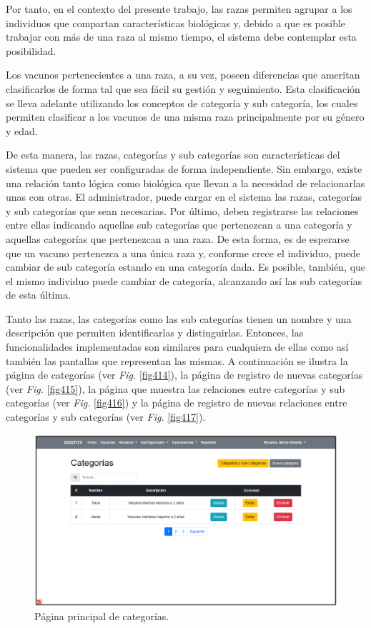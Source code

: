 \documentclass[11pt,oneside]{book}
\begin{document}
Por tanto, en el contexto del presente trabajo, las razas permiten agrupar a los individuos que compartan características biológicas y, debido a que es posible trabajar con más de una raza al mismo tiempo, el sistema debe contemplar esta posibilidad.

Los vacunos pertenecientes a una raza, a su vez, poseen diferencias que ameritan clasificarlos de forma tal que sea fácil su gestión y seguimiento. Esta clasificación se lleva adelante utilizando los conceptos de categoría y sub categoría, los cuales permiten clasificar a los vacunos de una misma raza principalmente por su género y edad.

De esta manera, las razas, categorías y sub categorías son características del sistema que pueden ser configuradas de forma independiente. Sin embargo, existe una relación tanto lógica como biológica que llevan a la necesidad de relacionarlas unas con otras. El administrador, puede cargar en el sistema las razas, categorías y sub categorías que sean necesarias. Por último, deben registrarse las relaciones entre ellas indicando aquellas sub categorías que pertenezcan a una categoría y aquellas categorías que pertenezcan a una raza. De esta forma, es de esperarse que un vacuno pertenezca a una única raza y, conforme crece el individuo, puede cambiar de sub categoría estando en una categoría dada. Es posible, también, que el mismo individuo puede cambiar de categoría, alcanzando así las sub categorías de esta última.

Tanto las razas, las categorías como las sub categorías tienen un nombre y una descripción que permiten identificarlas y distinguirlas. Entonces, las funcionalidades implementadas son similares para cualquiera de ellas como así también las pantallas que representan las mismas. A continuación se ilustra la página de categorías (ver \textit{Fig.} \eqref{fig414}), la página de registro de nuevas categorías (ver \textit{Fig.} \eqref{fig415}), la página que muestra las relaciones entre categorías y sub categorías (ver \textit{Fig.} \eqref{fig416}) y la página de registro de nuevas relaciones entre categorías y sub categorías (ver \textit{Fig.} \eqref{fig417}). 
\begin{figure}[tbhp]
\centerline{\includegraphics[scale=0.87]{figs/capitulo_4_desarrollo/fig414.pdf}}
\caption{Página principal de categorías.}
\label{fig414}
\end{figure}
\end{document}
